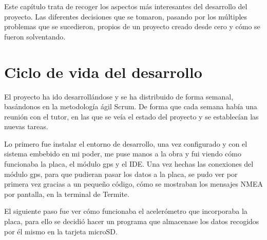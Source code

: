 

Este capítulo trata de recoger los aspectos más interesantes del desarrollo del proyecto. Las diferentes decisiones que se tomaron, pasando por los múltiples problemas que se sucedieron, propios de un proyecto creado desde cero y cómo se fueron solventando.

\section{Ciclo de vida del desarrollo}       
El proyecto ha ido desarrollándose y se ha distribuido de forma semanal, basándonos en la metodología ágil Scrum. De forma que cada semana había una reunión con el tutor, en las que se veía el estado del proyecto y se establecían las nuevas tareas.

Lo primero fue instalar el entorno de desarrollo, una vez configurado y con el sistema embebido en mi poder, me puse manos a la obra y fui viendo cómo funcionaba la placa, el módulo gps y el IDE. Una vez hechas las conexiones del módulo gps, para que pudieran pasar los datos a la placa, se pudo ver por primera vez gracias a un pequeño código, cómo se mostraban los mensajes NMEA por pantalla, en la terminal de Termite. 

El siguiente paso fue ver cómo funcionaba el acelerómetro que incorporaba la placa, para ello se decidió hacer un programa que almacenase los datos recogidos por él mismo en la tarjeta microSD. 

